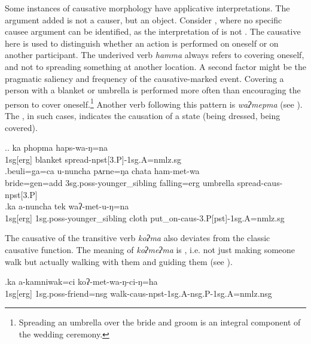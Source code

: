 Some instances of causative morphology have applicative interpretations. The argument added is not a causer, but an object. Consider \Next, where no specific causee argument can be identified, as the interpretation of \Next[b] is not . The causative here is used to distinguish whether an action is performed on oneself or on another participant. The underived verb \emph{hamma}  always refers to covering oneself, and not to spreading something at another location. A second factor might be the pragmatic saliency and frequency of the causative-marked event. Covering a person with a blanket or umbrella is performed more often than encouraging the person to cover oneself.\footnote{Spreading an umbrella over the bride and groom is an integral component of the wedding ceremony.} Another verb following this pattern is  \emph{waʔmepma}  (see \Next[c]). The , in such cases, indicates the causation of a state (being dressed, being covered).  


\ex.\ag. ka phopma haps-wa-ŋ=na\\ 
{\sc 1sg[erg]} blanket spread{\sc -npst[3.P]-1sg.A=nmlz.sg}\\
\bg.beuli=ga=ca  u-nuncha pʌrne=ŋa   chata    ham-met-wa\\
bride{\sc =gen=add} {\sc 3sg.poss-}younger\_sibling falling{\sc =erg} umbrella spread{\sc -caus-npst[3.P]}\\
  
\bg.ka a-nuncha tek waʔ-met-u-ŋ=na\\
{\sc 1sg[erg]}  {\sc 1sg.poss-}younger\_sibling cloth put\_on{\sc -caus-3.P[pst]-1sg.A=nmlz.sg}\\


The causative of the transitive verb \emph{koʔma}  also deviates  from the classic causative function. The meaning of \emph{koʔmeʔma} is , i.e. not just making someone walk but actually walking with them and guiding them (see \Next). 

\exg.ka a-kamniwak=ci  koʔ-met-wa-ŋ-ci-ŋ=ha\\
{\sc 1sg[erg]}  {\sc 1sg.poss-}friend{\sc =nsg} walk{\sc -caus-npst-1sg.A-nsg.P-1sg.A=nmlz.nsg} \\
 
